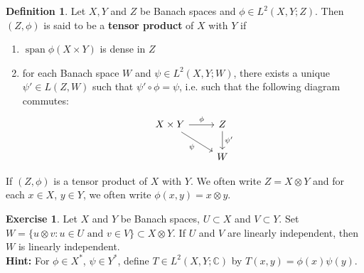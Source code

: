 \documentclass[12pt]{amsart}
\theoremstyle{definition}
\newtheorem{defn}[definition]{Definition}
\newtheorem{ex}[definition]{Exercise}
\newcommand{\C}{\mathbb{C}}
\DeclareMathOperator{\spn}{span}
\begin{document}
	\begin{defn}
	Let $X, Y$ and $Z$ be Banach spaces and $\phi \in L^2(X,Y ; Z) $. Then $(Z, \phi)$ is said to be a \textbf{tensor product} of $X$ with $Y$ if 
	\begin{enumerate}
	\item $\spn \phi(X \times Y)$ is dense in $Z$
	\item for each Banach space $W$ and $\psi \in L^2(X,Y;W)$, there exists a unique $\psi' \in L(Z, W)$ such that $\psi' \circ \phi = \psi$, i.e. such that the following diagram commutes: 
	\[ \begin{tikzcd}
	X \times Y \arrow[r, "\phi"] \arrow[dr, "\psi"'] 	
	& Z  \arrow[d, "\psi'"] \\
	& W 
\end{tikzcd}
	\]
	\end{enumerate}
	If $(Z, \phi)$ is a tensor product of $X$ with $Y$. We often write $Z = X \otimes Y$ and for each $x\in X$, $y \in Y$, we often write $\phi(x,y) = x \otimes y$.
	\end{defn}	
	
	\begin{ex}
	Let $X$ and $Y$ be Banach spaces, $U \subset X$ and $V \subset Y$. Set $W = \{u \otimes v: u \in U \text{ and } v \in V\} \subset X \otimes Y$. If $U$ and $V$ are linearly independent, then $W$ is linearly independent.\\
	\textbf{Hint:} For $\phi \in X^*$, $\psi \in Y^*$, define $T \in L^2(X, Y; \C)$ by $T(x,y) = \phi(x)\psi(y)$.
	\end{ex}	
	
\end{document}
